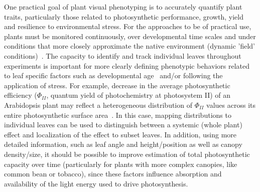 One practical goal of plant visual phenotyping is to accurately quantify plant traits, particularly those related to photosynthetic performance, growth, yield and resilience to environmental stress.  
For the approaches to be of practical use, plants must be monitored continuously, over developmental time scales and under conditions that more closely approximate the native environment (dynamic 'field' conditions)~\cite{fahlgren2015lights,walter2015plant}.
%
The capacity to identify and track individual leaves throughout experiments is important for more clearly defining phenotypic behaviors related to leaf specific factors such as developmental age~\cite{schottler2015photosynthetic} and/or following the application of stress. 
For example, decrease in the average photosynthetic efficiency ($\Phi_{II}$, quantum yield of photochemistry at photosystem II) of an Arabidopsis plant may reflect a heterogeneous distribution of $\Phi_{II}$ values across its entire photosynthetic surface area~\cite{oxborough2004imaging}. 
In this case, mapping distributions to individual leaves can be used to distinguish between a systemic (whole plant) effect and localization of the effect to subset leaves.
%
In addition, using more detailed information, such as leaf angle and height/position as well as canopy density/size, it should be possible to improve estimation of total photosynthetic capacity over time (particularly for plants with more complex canopies, like common bean or tobacco), since these factors influence absorption and availability of the light energy used to drive photosynthesis.

